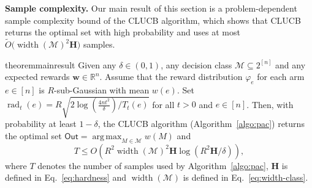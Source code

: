 \documentclass{article}
\newcommand{\junk}[1]{}
\newcommand{\Algorithm}{{\small \textsf{CLUCB}}\xspace}
\newcommand{\Rew}{\varphi}
\newcommand{\M}{\mathcal M}
\newcommand{\B}{\mathcal B}
\newcommand{\RR}{\mathbb R}
\DeclareMathOperator{\rank}{width}
\DeclareMathOperator{\rad}{rad}
\DeclareMathOperator*{\argmax}{arg\,max}
\newcommand{\out}{\mathsf{Out}}
\newcommand{\MultiIdent}{\textsc{TopK}\xspace}
\newcommand{\Matroid}{\textsc{Matroid}\xspace}
\newcommand{\Match}{\textsc{Match}\xspace}
\newcommand{\Path}{\textsc{Path}\xspace}
\renewcommand{\vec}[1]{\boldsymbol{#1}}
\begin{document}
\textbf{Sample complexity.} 
Our main result of this section is a problem-dependent sample complexity bound of the \Algorithm algorithm, which shows that \Algorithm returns the optimal set with high probability and uses at most $\tilde O\big(\rank(\M)^2 \mathbf H\big)$ samples.
\begin{restatable}{theorem}{mainresult}
Given any $\delta \in (0,1)$, any decision class $\M \subseteq 2^{[n]}$ and any expected rewards $\vec w \in \RR^{n}$.
Assume that the reward distribution $\Rew_e$ for each arm $e\in [n]$ is  $R$-sub-Gaussian with mean $w(e)$.
Set $\rad_t(e) = R\sqrt{2\log\left(\frac{4n t^2}\delta\right)/ T_t(e) }$ for all $t > 0$ and $e\in[n]$.
Then, with probability at least $1-\delta$, the \Algorithm algorithm (Algorithm~\ref{algo:pac}) returns the optimal set $\out=\argmax_{M\in \M} w(M)$ and
\begin{equation}
\label{eq:sample-complexity}
T \le O\left(R^2\rank(\M)^2\mathbf H\log\left(R^2 \mathbf H /\delta\right)\right),
\end{equation}
where $T$ denotes the number of samples used by Algorithm~\ref{algo:pac}, $\mathbf H$ is defined in Eq.~\eqref{eq:hardness} and $\rank(\M)$ is defined in Eq.~\eqref{eq:width-class}.
\label{theorem:main}
\end{restatable}
\junk{
By combining Lemma~\ref{lemma:example-exchange-class} and Theorem~\ref{theorem:main}, we can bound the sample complexity of \Algorithm for our running examples.
\begin{corollary}
\begin{itemize}
	\item \MultiIdent. $T \le O\big(\mathbf H \log(n\mathbf H/\delta)\big)$.
	\item \Matroid. $T \le O\big(\mathbf H \log(n\mathbf H/\delta)\big)$.
	\item \Match. $T \le O\big(|V|^2 \mathbf H \log(n |V|^2 \mathbf H/\delta)\big)$.
	\item \Path. $T \le O\big(|V|^2 \mathbf H \log(n |V|^2 \mathbf H/\delta)\big)$.
\end{itemize}
\end{corollary}
}


\vspace{-0.5em}
\end{document}
